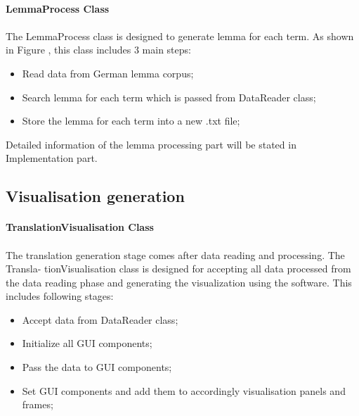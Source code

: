 \paragraph{LemmaProcess Class}

\paragraph[]{}
The LemmaProcess class is designed to generate lemma for each term. As shown in Figure \label{lemma}, this class includes 3 main steps:
\begin{itemize}
	\item \textbf{}Read data from German lemma corpus;
	\item \textbf{}Search lemma for each term which is passed from DataReader class;
	\item \textbf{}Store the lemma for each term into a new .txt file;
\end{itemize} 
Detailed information of the lemma processing part will be stated in Implementation part. 

\subsection{Visualisation generation}

\paragraph{TranslationVisualisation Class}

\paragraph[]{}The translation generation stage comes after data reading and processing. The Transla- tionVisualisation class is designed for accepting all data processed from the data reading phase and generating the visualization using the software. This includes following stages:
\begin{itemize}
	\item \textbf{}Accept data from DataReader class;
	\item \textbf{}Initialize all GUI components;
	\item \textbf{}Pass the data to GUI components;
	\item \textbf{}Set GUI components and add them to accordingly visualisation panels and frames;

\end{itemize}  

